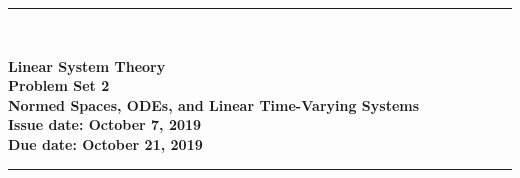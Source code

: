 \documentclass[fleqn, 10.5pt, a4paper]{article}
\theoremstyle{definition}
\numberwithin{equation}{section}
\begin{document}
\thispagestyle{plain}

\vspace*{-1.5cm}
{\noindent \rule{15.8cm}{.3mm} \\[.3cm]}
\begin{center} \bf
{\large Linear System Theory \medskip
\\
Problem Set 2 \\
Normed Spaces, ODEs, and Linear Time-Varying Systems\medskip
\\ Issue date: October 7, 2019
\\ Due date: October 21, 2019}
\end{center}
\rule{15.8cm}{.3mm} \\[0cm]
\end{document}
